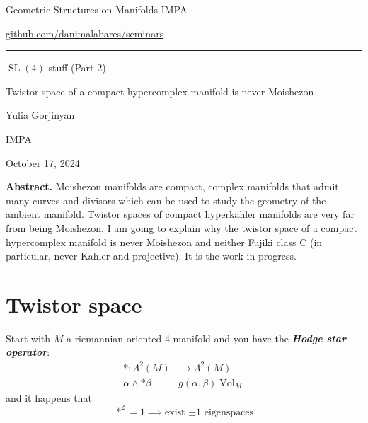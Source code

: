 



\begin{minipage}{\textwidth}
	\begin{minipage}{1\textwidth}
		Geometric Structures on Manifolds \hfill IMPA
		
		{\small\hfill\href{https://github.com/danimalabares/seminars}{github.com/danimalabares/seminars}}

		
	\end{minipage}
\end{minipage}\vspace{.2cm}\hrule

\vspace{10pt}

{\Huge  $\operatorname{SL}(4)$-stuff (Part 2)}


{\Large Twistor space of a compact hypercomplex manifold is never Moishezon}


\hfill{\Large Yulia Gorjinyan}

{\Large \hfill IMPA}

\hfill{\large October 17, 2024}

\vspace{1em}

{\color{6}\bfseries Abstract.}\hspace{.5em}  Moishezon manifolds are compact, complex manifolds that admit many curves and divisors which can be used to study the geometry of the ambient manifold. Twistor spaces of compact hyperkahler manifolds are very far from being Moishezon. I am going to explain why the twistor space of a compact hypercomplex manifold is never Moishezon and neither Fujiki class C (in particular, never Kahler and projective). It is the work in progress.


\tableofcontents

\section{Twistor space}


Start with $M$ a riemannian oriented 4 manifold  and you have the \textit{\textbf{Hodge star operator}}:
\begin{align*}
	*: \Lambda^{2}(M) &\longrightarrow \Lambda^{2}(M) \\
	\alpha\wedge *\beta &g(\alpha,\beta)\operatorname{Vol}_M
\end{align*}
and it happens that
 \[*^2=1\implies \text{exist $\pm 1$ eigenspaces} \]

